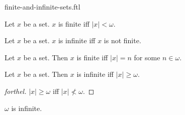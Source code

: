 \documentclass{naproche-library}
\begin{document}
\begin{smodule}[title=Finite and Infinite Sets]{finite-and-infinite-sets.ftl}

\begin{definition}[forthel,id=SET_THEORY_07_5346658235711488]
  Let $x$ be a set.
  $x$ is finite iff $|x| < \omega$.
\end{definition}

\begin{definition}[forthel,id=SET_THEORY_07_8295412068777984]
  Let $x$ be a set.
  $x$ is infinite iff $x$ is not finite.
\end{definition}

\begin{proposition}[forthel,id=SET_THEORY_07_3806229474312192]
  Let $x$ be a set.
  Then $x$ is finite iff $|x| = n$ for some $n \in \omega$.
\end{proposition}

\begin{proposition}[forthel,id=SET_THEORY_07_3174577070931968]
  Let $x$ be a set.
  Then $x$ is infinite iff $|x| \geq \omega$.
\end{proposition}
\begin{proof}[forthel]
  $|x| \geq \omega$ iff $|x| \nless \omega$.
\end{proof}

\begin{proposition}[forthel,id=SET_THEORY_07_9154385075632368]
  $\omega$ is infinite.
\end{proposition}
\end{smodule}
\end{document}
